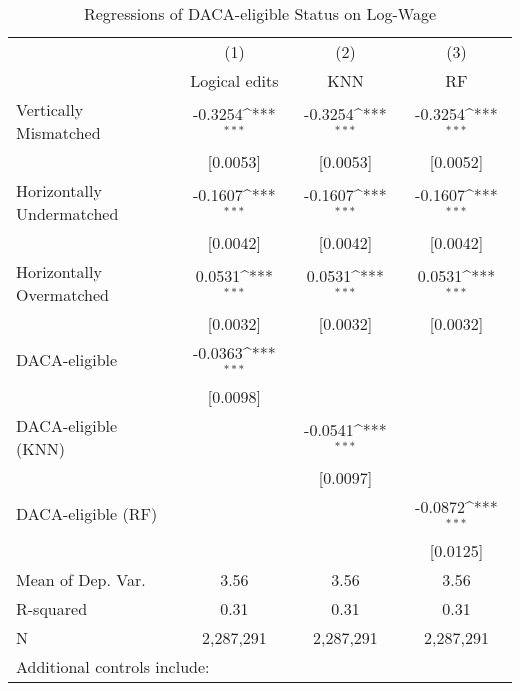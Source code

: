 \begin{table}[htbp]\centering
\def\sym#1{\ifmmode^{#1}\else\(^{#1}\)\fi}
\caption{Regressions of DACA-eligible Status on Log-Wage}
\begin{tabular}{l*{3}{c}}
\toprule
                    &\multicolumn{1}{c}{(1)}         &\multicolumn{1}{c}{(2)}         &\multicolumn{1}{c}{(3)}         \\
                    &Logical edits         &         KNN         &          RF         \\
\midrule
Vertically Mismatched&     -0.3254\sym{***}&     -0.3254\sym{***}&     -0.3254\sym{***}\\
                    &    [0.0053]         &    [0.0053]         &    [0.0052]         \\
\addlinespace
Horizontally Undermatched&     -0.1607\sym{***}&     -0.1607\sym{***}&     -0.1607\sym{***}\\
                    &    [0.0042]         &    [0.0042]         &    [0.0042]         \\
\addlinespace
Horizontally Overmatched&      0.0531\sym{***}&      0.0531\sym{***}&      0.0531\sym{***}\\
                    &    [0.0032]         &    [0.0032]         &    [0.0032]         \\
\addlinespace
DACA-eligible       &     -0.0363\sym{***}&                     &                     \\
                    &    [0.0098]         &                     &                     \\
\addlinespace
DACA-eligible (KNN) &                     &     -0.0541\sym{***}&                     \\
                    &                     &    [0.0097]         &                     \\
\addlinespace
DACA-eligible (RF)  &                     &                     &     -0.0872\sym{***}\\
                    &                     &                     &    [0.0125]         \\
\midrule
Mean of Dep. Var.   &        3.56         &        3.56         &        3.56         \\
R-squared           &        0.31         &        0.31         &        0.31         \\
N                   &   2,287,291         &   2,287,291         &   2,287,291         \\
\bottomrule
\multicolumn{4}{l}{\footnotesize Additional controls include:}\\

\end{tabular}
\end{table}
